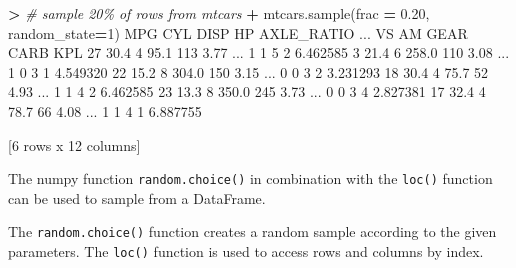 \documentclass[
]{book}
\newenvironment{Shaded}{\begin{snugshade}}{\end{snugshade}}
\newcommand{\CommentTok}[1]{\textcolor[rgb]{0.56,0.35,0.01}{\textit{#1}}}
\newcommand{\DecValTok}[1]{\textcolor[rgb]{0.00,0.00,0.81}{#1}}
\newcommand{\FloatTok}[1]{\textcolor[rgb]{0.00,0.00,0.81}{#1}}
\newcommand{\NormalTok}[1]{#1}
\newcommand{\OperatorTok}[1]{\textcolor[rgb]{0.81,0.36,0.00}{\textbf{#1}}}
\begin{document}
\begin{Shaded}
\begin{Highlighting}[]
\OperatorTok{\textgreater{}} \CommentTok{\# sample 20\% of rows from mtcars}
\OperatorTok{+}\NormalTok{ mtcars.sample(frac }\OperatorTok{=} \FloatTok{0.20}\NormalTok{, random\_state}\OperatorTok{=}\DecValTok{1}\NormalTok{)}
\NormalTok{     MPG  CYL   DISP   HP  AXLE\_RATIO  ...  VS  AM  GEAR CARB       KPL}
\DecValTok{27}  \FloatTok{30.4}    \DecValTok{4}   \FloatTok{95.1}  \DecValTok{113}        \FloatTok{3.77}\NormalTok{  ...   }\DecValTok{1}   \DecValTok{1}     \DecValTok{5}    \DecValTok{2}  \FloatTok{6.462585}
\DecValTok{3}   \FloatTok{21.4}    \DecValTok{6}  \FloatTok{258.0}  \DecValTok{110}        \FloatTok{3.08}\NormalTok{  ...   }\DecValTok{1}   \DecValTok{0}     \DecValTok{3}    \DecValTok{1}  \FloatTok{4.549320}
\DecValTok{22}  \FloatTok{15.2}    \DecValTok{8}  \FloatTok{304.0}  \DecValTok{150}        \FloatTok{3.15}\NormalTok{  ...   }\DecValTok{0}   \DecValTok{0}     \DecValTok{3}    \DecValTok{2}  \FloatTok{3.231293}
\DecValTok{18}  \FloatTok{30.4}    \DecValTok{4}   \FloatTok{75.7}   \DecValTok{52}        \FloatTok{4.93}\NormalTok{  ...   }\DecValTok{1}   \DecValTok{1}     \DecValTok{4}    \DecValTok{2}  \FloatTok{6.462585}
\DecValTok{23}  \FloatTok{13.3}    \DecValTok{8}  \FloatTok{350.0}  \DecValTok{245}        \FloatTok{3.73}\NormalTok{  ...   }\DecValTok{0}   \DecValTok{0}     \DecValTok{3}    \DecValTok{4}  \FloatTok{2.827381}
\DecValTok{17}  \FloatTok{32.4}    \DecValTok{4}   \FloatTok{78.7}   \DecValTok{66}        \FloatTok{4.08}\NormalTok{  ...   }\DecValTok{1}   \DecValTok{1}     \DecValTok{4}    \DecValTok{1}  \FloatTok{6.887755}

\NormalTok{[}\DecValTok{6}\NormalTok{ rows x }\DecValTok{12}\NormalTok{ columns]}
\end{Highlighting}
\end{Shaded}

The numpy function \texttt{random.choice()} in combination with the \texttt{loc()} function can be used to sample from a DataFrame.

The \texttt{random.choice()} function creates a random sample according to the given parameters. The \texttt{loc()} function is used to access rows and columns by index.
\end{document}
